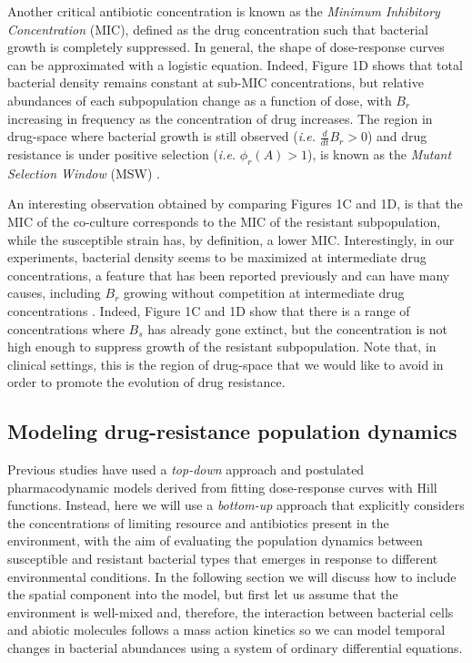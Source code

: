 \documentclass[fleqn,12pt]{wlscirep}
\begin{document}
Another critical antibiotic concentration is known as the {\em Minimum Inhibitory Concentration} (MIC), defined as the drug concentration such that bacterial growth is completely suppressed. In general, the shape of dose-response curves can be approximated with a logistic equation. Indeed, Figure 1D shows that total bacterial density remains constant at sub-MIC concentrations, but relative abundances of each subpopulation change as a function of dose, with $B_r$ increasing in frequency as the concentration of drug increases.  The region in drug-space where bacterial growth is still observed ({\em i.e.} $\frac{d }{dt}B_r>0$) and drug resistance is under positive selection ({\em i.e.} $\phi_r(A)>1$), is known as the {\em Mutant Selection Window} (MSW) \cite{Drlica2007}. 

An interesting observation obtained by comparing Figures 1C and 1D, is that the MIC of the co-culture corresponds to the MIC of the resistant subpopulation, while the susceptible strain has, by definition, a lower MIC.  Interestingly, in our experiments, bacterial density seems to be maximized at intermediate drug concentrations, a feature that has been reported previously\cite{Eagle1948} and can have many causes, including $B_r$ growing without competition at intermediate drug concentrations \cite{PenaMiller2014}. Indeed, Figure 1C and 1D show that there is a range of concentrations where $B_s$ has already gone extinct, but the concentration is not high enough to suppress growth of the resistant subpopulation.  Note that, in clinical settings, this is the region of drug-space that we would like to avoid in order to promote the evolution of drug resistance.


\subsection*{Modeling drug-resistance population dynamics}

Previous studies have used a {\em top-down} approach and postulated pharmacodynamic models derived from fitting dose-response curves with Hill functions\cite{Engelstadter2014,Regoes2004}.  Instead, here we will use a {\em bottom-up} approach that explicitly considers the concentrations of limiting resource and antibiotics present in the environment, with the aim of evaluating the population dynamics between susceptible and resistant bacterial types that emerges in response to different environmental conditions. In the following section we will discuss how to include the spatial component into the model, but first let us assume that the environment is well-mixed and, therefore,  the interaction between bacterial cells and abiotic molecules follows a mass action kinetics so we can model temporal changes in bacterial abundances using a system of ordinary differential equations.
\end{document}
